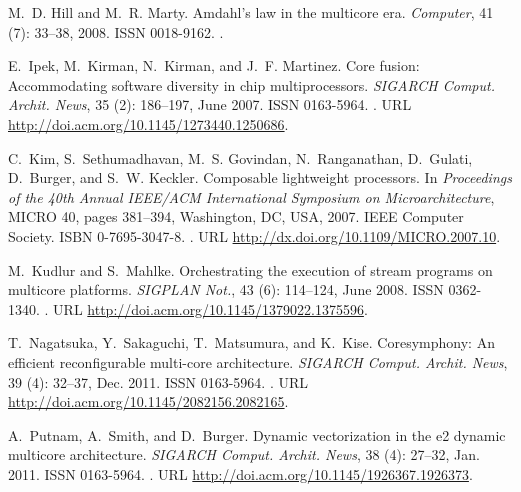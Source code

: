 \documentclass{sigplanconf}
\begin{document}
\begin{thebibliography}{}
M.~D. Hill and M.~R. Marty.
\newblock Amdahl's law in the multicore era.
\newblock \emph{Computer}, 41 (7): 33--38, 2008.
\newblock ISSN 0018-9162.
\newblock {}.

E.~Ipek, M.~Kirman, N.~Kirman, and J.~F. Martinez.
\newblock Core fusion: Accommodating software diversity in chip
  multiprocessors.
\newblock \emph{SIGARCH Comput. Archit. News}, 35 (2):
  186--197, June 2007.
\newblock ISSN 0163-5964.
\newblock {}.
\newblock URL \url{http://doi.acm.org/10.1145/1273440.1250686}.

C.~Kim, S.~Sethumadhavan, M.~S. Govindan, N.~Ranganathan, D.~Gulati, D.~Burger,
  and S.~W. Keckler.
\newblock Composable lightweight processors.
\newblock In \emph{Proceedings of the 40th Annual IEEE/ACM International
  Symposium on Microarchitecture}, MICRO 40, pages 381--394, Washington, DC,
  USA, 2007. IEEE Computer Society.
\newblock ISBN 0-7695-3047-8.
\newblock {}.
\newblock URL \url{http://dx.doi.org/10.1109/MICRO.2007.10}.

M.~Kudlur and S.~Mahlke.
\newblock Orchestrating the execution of stream programs on multicore
  platforms.
\newblock \emph{SIGPLAN Not.}, 43 (6): 114--124, June 2008.
\newblock ISSN 0362-1340.
\newblock {}.
\newblock URL \url{http://doi.acm.org/10.1145/1379022.1375596}.

T.~Nagatsuka, Y.~Sakaguchi, T.~Matsumura, and K.~Kise.
\newblock Coresymphony: An efficient reconfigurable multi-core architecture.
\newblock \emph{SIGARCH Comput. Archit. News}, 39 (4):
  32--37, Dec. 2011.
\newblock ISSN 0163-5964.
\newblock {}.
\newblock URL \url{http://doi.acm.org/10.1145/2082156.2082165}.

A.~Putnam, A.~Smith, and D.~Burger.
\newblock Dynamic vectorization in the e2 dynamic multicore architecture.
\newblock \emph{SIGARCH Comput. Archit. News}, 38 (4):
  27--32, Jan. 2011.
\newblock ISSN 0163-5964.
\newblock {}.
\newblock URL \url{http://doi.acm.org/10.1145/1926367.1926373}.


\end{thebibliography}
\end{document}
